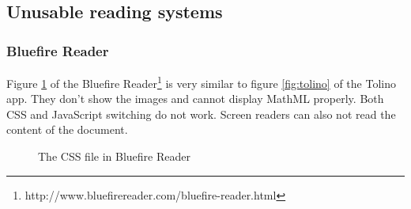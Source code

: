\subsection{Unusable reading systems}
\subsubsection{Bluefire Reader}
Figure \ref{fig:Bluefire} of the Bluefire Reader\footnote{http://www.bluefirereader.com/bluefire-reader.html} is very similar to figure \ref{fig:tolino} of the Tolino app. They don't show the images and cannot display MathML properly. Both CSS and JavaScript switching do not work. Screen readers can also not read the content of the document.
\begin{figure}[H]
	\centering
	\caption{The CSS file in Bluefire Reader}
	\label{fig:Bluefire}
\end{figure}

